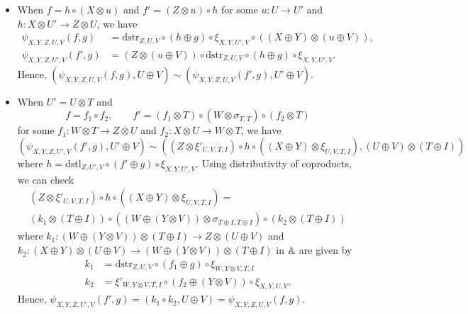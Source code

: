 \begin{itemize}
\item When $f = h \circ (X \otimes u)$ and
  $f' = (Z \otimes u) \circ h$ for some $u \colon U \to U'$ and
  $h \colon X \otimes U' \to Z \otimes U$, we have
\begin{align*}
  \psi_{X,Y,Z,U,V}(f,g) &= \mathrm{dstr}_{Z,U,V} \circ
  (h \oplus g) \circ \xi_{X,Y,U',V} \circ ((X \oplus Y) \otimes (u \oplus V)), \\
  \psi_{X,Y,Z,U',V}(f',g) &= (Z \otimes (u \oplus V)) \circ \mathrm{dstr}_{Z,U,V} \circ
  (h \oplus g) \circ \xi_{X,Y,U',V}.
\end{align*}
Hence, $(\psi_{X,Y,Z,U,V}(f,g),U \oplus V) \sim (\psi_{X,Y,Z,U,V}(f',g),U' \oplus V)$.
\item When $U' = U \otimes T$ and 
\begin{equation*}
  f = f_{1} \circ f_{2}, \qquad
  f' = (f_{1} \otimes T) \circ (W \otimes \sigma_{T,T}) \circ (f_{2} \otimes T)
\end{equation*}
for some $f_{1} \colon W \otimes T \to Z \otimes U$
and $f_{2} \colon X \otimes U \to W \otimes T$, we have
\begin{equation*}
  (\psi_{X,Y,Z,U',V}(f',g),U' \oplus V)
  \sim ((Z \otimes \xi'_{U,V,T,I}) \circ h \circ ((X \oplus Y) \otimes \xi_{U,V,T,I}),
  (U \oplus V) \otimes (T \oplus I))
\end{equation*}
where $h = \mathrm{dstl}_{Z,U',V} \circ (f' \oplus g) \circ \xi_{X,Y,U',V}$.
Using distributivity of coproducts, we can check
\begin{multline*}
  (Z \otimes \xi'_{U,V,T,I}) \circ h \circ ((X \oplus Y) \otimes \xi_{U,V,T,I}) = \\
  (k_{1} \otimes (T \oplus I)) \circ
  ((W \oplus (Y \otimes V)) \otimes \sigma_{T \oplus I,T \oplus I}) \circ
  (k_{2} \otimes (T \oplus I))
\end{multline*}
where $k_{1} \colon (W \oplus (Y \otimes V)) \otimes (T \oplus I) \to Z \otimes (U \oplus V)$
and $k_{2} \colon (X \oplus Y) \otimes (U \oplus V) \to (W \oplus (Y \otimes V))
\otimes (T \oplus I)$ in $\mathbb{A}$ are given by
\begin{align*}
  k_{1} &= \mathrm{dstr}_{Z,U,V} \circ (f_{1} \oplus g) \circ \xi_{W,Y \otimes V,T,I} \\
  k_{2} &= \xi'_{W,Y \otimes V,T,I} \circ (f_{2} \oplus (Y \otimes V)) \circ \xi_{X,Y,U,V}.
\end{align*} 
Hence, $\psi_{X,Y,Z,U',V}(f',g) = (k_{1} \circ k_{2},U \oplus V) = \psi_{X,Y,Z,U,V}(f,g)$.
\end{itemize}

